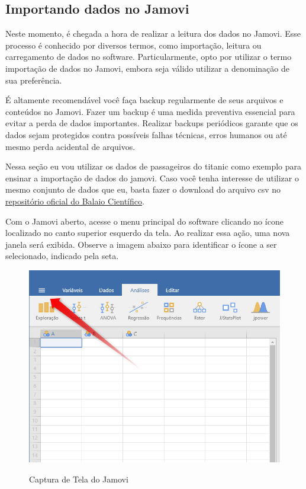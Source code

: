 \subsection{Importando dados no Jamovi}

Neste momento, é chegada a hora de realizar a leitura dos dados no Jamovi. Esse processo é conhecido por diversos termos, como importação, leitura ou carregamento de dados no software. Particularmente, opto por utilizar o termo importação de dados no Jamovi, embora seja válido utilizar a denominação de sua preferência.

\begin{tcolorbox}[colback=white,colframe=orange,title= Importante]
  É altamente recomendável você faça backup regularmente de seus arquivos e conteúdos no Jamovi. Fazer um backup é uma medida preventiva essencial para evitar a perda de dados importantes. Realizar backups periódicos garante que os dados sejam protegidos contra possíveis falhas técnicas, erros humanos ou até mesmo perda acidental de arquivos.
\end{tcolorbox}

Nessa seção eu vou utilizar os dados de passageiros do titanic como exemplo para ensinar a importação de dados do jamovi. Caso você tenha interesse de utilizar o mesmo conjunto de dados que eu, basta fazer o download do arquivo csv no \href{https://github.com/balaio-cientifico/dataset}{repositório oficial do Balaio Científico}.

Com o Jamovi aberto, acesse o menu principal do software clicando no ícone localizado no canto superior esquerdo da tela. Ao realizar essa ação, uma nova janela será exibida. Observe a imagem abaixo para identificar o ícone a ser selecionado, indicado pela seta.

\begin{figure}[H]
  \centering
  \caption{Captura de Tela do Jamovi}
  \includegraphics[width=\textwidth]{imagens/cap_1/importa_dados_1.png}
  \label{fig:importa_dados_1}
\end{figure}


